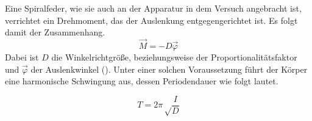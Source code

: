 Eine Spiralfeder, wie sie auch an der Apparatur in dem Versuch angebracht ist, verrichtet ein Drehmoment, das der Auslenkung entgegengerichtet ist.
Es folgt damit der Zusammenhang.
\begin{equation}
    \label{eqn:winkelrichtgr}
    \vec M = -D \vec\varphi    
\end{equation} 
Dabei ist $D$ die Winkelrichtgröße, beziehungsweise der Proportionalitätsfaktor
und $\vec\varphi$ der Auslenkwinkel (\cite{gerthsen}).
Unter einer solchen Voraussetzung führt der Körper eine harmonische Schwingung aus, dessen Periodendauer wie folgt lautet.

\begin{equation}
    \label{eqn:periode}
    T=2\pi\sqrt\frac{I}{D}
\end{equation}
